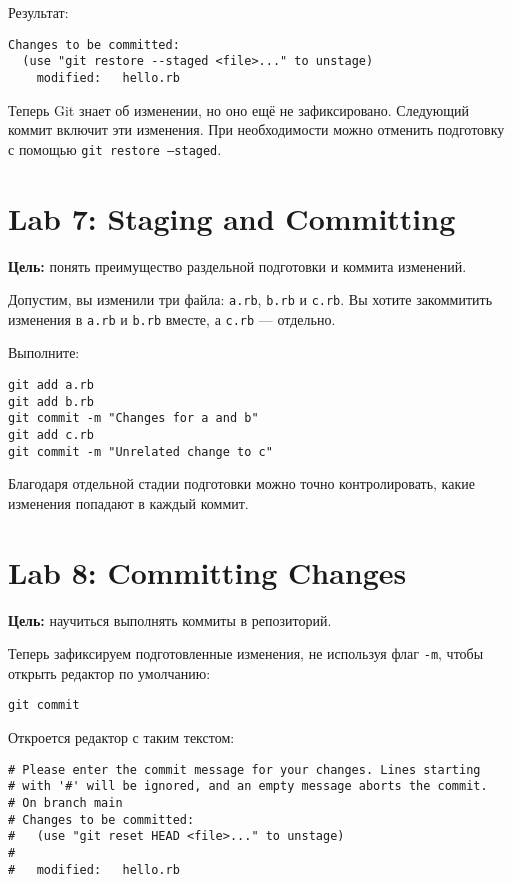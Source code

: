 \documentclass[a4paper,12pt]{report}
\begin{document}
Результат:
\begin{verbatim}
Changes to be committed:
  (use "git restore --staged <file>..." to unstage)
	modified:   hello.rb
\end{verbatim}

Теперь Git знает об изменении, но оно ещё не зафиксировано. Следующий коммит включит эти изменения. При необходимости можно отменить подготовку с помощью \texttt{git restore --staged}.


\section{Lab 7: Staging and Committing}
\textbf{Цель:} понять преимущество раздельной подготовки и коммита изменений.

Допустим, вы изменили три файла: \texttt{a.rb}, \texttt{b.rb} и \texttt{c.rb}. Вы хотите закоммитить изменения в \texttt{a.rb} и \texttt{b.rb} вместе, а \texttt{c.rb} — отдельно.

Выполните:
\begin{verbatim}
git add a.rb
git add b.rb
git commit -m "Changes for a and b"
git add c.rb
git commit -m "Unrelated change to c"
\end{verbatim}

Благодаря отдельной стадии подготовки можно точно контролировать, какие изменения попадают в каждый коммит.


\section{Lab 8: Committing Changes}
\textbf{Цель:} научиться выполнять коммиты в репозиторий.

Теперь зафиксируем подготовленные изменения, не используя флаг \texttt{-m}, чтобы открыть редактор по умолчанию:
\begin{verbatim}
git commit
\end{verbatim}

Откроется редактор с таким текстом:
\begin{verbatim}
# Please enter the commit message for your changes. Lines starting
# with '#' will be ignored, and an empty message aborts the commit.
# On branch main
# Changes to be committed:
#   (use "git reset HEAD <file>..." to unstage)
#
#	modified:   hello.rb
\end{verbatim}
\end{document}
